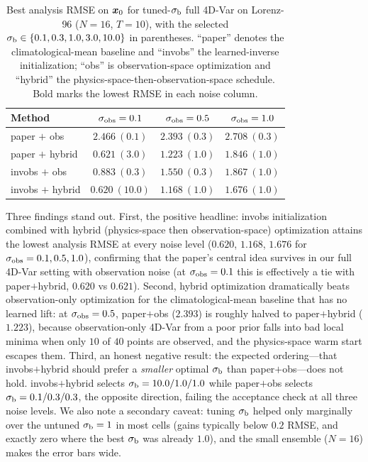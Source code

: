 \begin{table}[H]
  \centering
  \caption{Best analysis RMSE on $\bm{x}_0$ for tuned-$\sigma_{\mathrm{b}}$ full 4D-Var on Lorenz-96
  ($N = 16$, $T = 10$), with the selected $\sigma_{\mathrm{b}} \in \{0.1, 0.3, 1.0, 3.0, 10.0\}$ in
  parentheses. ``paper'' denotes the climatological-mean baseline and ``invobs'' the
  learned-inverse initialization; ``obs'' is observation-space optimization and ``hybrid''
  the physics-space-then-observation-space schedule. Bold marks the lowest RMSE in each
  noise column.}
  \label{tab:l96-tuned}
  \begin{tabular}{lccc}
    \toprule
    Method & $\sigma_{\mathrm{obs}} = 0.1$ & $\sigma_{\mathrm{obs}} = 0.5$ & $\sigma_{\mathrm{obs}} = 1.0$ \\
    \midrule
    paper $+$ obs    & $2.466\ (0.1)$           & $2.393\ (0.3)$           & $2.708\ (0.3)$ \\
    paper $+$ hybrid & $0.621\ (3.0)$           & $1.223\ (1.0)$           & $1.846\ (1.0)$ \\
    invobs $+$ obs   & $0.883\ (0.3)$           & $1.550\ (0.3)$           & $1.867\ (1.0)$ \\
    invobs $+$ hybrid& $\mathbf{0.620}\ (10.0)$ & $\mathbf{1.168}\ (1.0)$  & $\mathbf{1.676}\ (1.0)$ \\
    \bottomrule
  \end{tabular}
\end{table}

Three findings stand out. First, the positive headline: invobs initialization combined
with hybrid (physics-space then observation-space) optimization attains the lowest
analysis RMSE at every noise level ($0.620$, $1.168$, $1.676$ for
$\sigma_{\mathrm{obs}} = 0.1, 0.5, 1.0$), confirming that the paper's central idea survives in our full
4D-Var setting with observation noise (at $\sigma_{\mathrm{obs}} = 0.1$ this is effectively a tie with
paper$+$hybrid, $0.620$ vs $0.621$). Second, hybrid optimization dramatically beats
observation-only optimization for the climatological-mean baseline that has no learned
lift: at $\sigma_{\mathrm{obs}} = 0.5$, paper$+$obs ($2.393$) is roughly halved to paper$+$hybrid
($1.223$), because observation-only 4D-Var from a poor prior falls into bad local minima
when only $10$ of $40$ points are observed, and the physics-space warm start escapes them.
Third, an honest negative result: the expected ordering---that invobs$+$hybrid should
prefer a \emph{smaller} optimal $\sigma_{\mathrm{b}}$ than paper$+$obs---does not hold. invobs$+$hybrid
selects $\sigma_{\mathrm{b}} = 10.0/1.0/1.0$ while paper$+$obs selects $\sigma_{\mathrm{b}} = 0.1/0.3/0.3$, the
opposite direction, failing the acceptance check at all three noise levels. We also note a
secondary caveat: tuning $\sigma_{\mathrm{b}}$ helped only marginally over the untuned $\sigma_{\mathrm{b}} = 1$ in
most cells (gains typically below $0.2$ RMSE, and exactly zero where the best $\sigma_{\mathrm{b}}$ was
already $1.0$), and the small ensemble ($N = 16$) makes the error bars wide.

